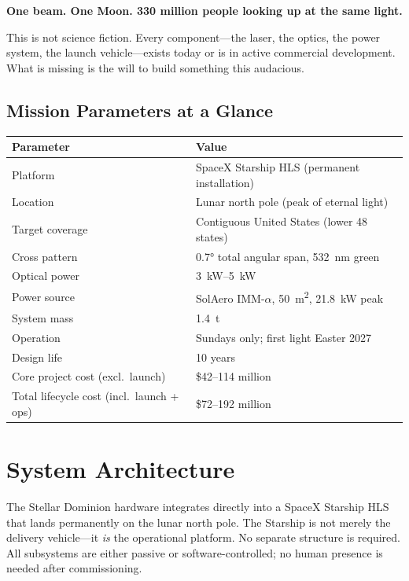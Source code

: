 \documentclass[12pt,letterpaper]{article}
\begin{document}
\begin{emeraldquote}
  \textbf{One beam. One Moon. 330 million people looking up at the same light.}
\end{emeraldquote}

This is not science fiction. Every component---the laser, the optics, the power
system, the launch vehicle---exists today or is in active commercial
development. What is missing is the will to build something this audacious.

\subsection{Mission Parameters at a Glance}

\begin{center}
\begin{tabular}{ll}
\toprule
\textbf{Parameter} & \textbf{Value} \\
\midrule
Platform & SpaceX Starship HLS (permanent installation) \\
Location & Lunar north pole (peak of eternal light) \\
Target coverage & Contiguous United States (lower 48 states) \\
Cross pattern & \ang{0.7} total angular span, \SI{532}{\nano\meter} green \\
Optical power & \SI{3}{\kilo\watt}--\SI{5}{\kilo\watt} \\
Power source & SolAero IMM-\(\alpha\), \SI{50}{\meter\squared}, \SI{21.8}{\kilo\watt} peak \\
System mass & \SI{1.4}{\tonne} \\
Operation & Sundays only; first light Easter 2027 \\
Design life & 10 years \\
Core project cost (excl.\ launch) & \$42--114 million \\
Total lifecycle cost (incl.\ launch + ops) & \$72--192 million \\
\bottomrule
\end{tabular}
\end{center}

\section{System Architecture}

The Stellar Dominion hardware integrates directly into a SpaceX Starship HLS
that lands permanently on the lunar north pole. The Starship is not merely the
delivery vehicle---it \emph{is} the operational platform. No separate structure
is required. All subsystems are either passive or software-controlled; no
human presence is needed after commissioning.
\end{document}

